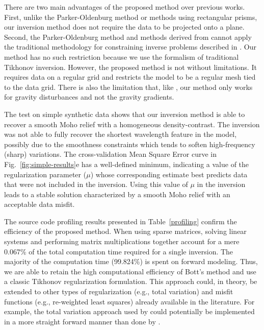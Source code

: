 \documentclass[extra,mreferee]{gji}
\begin{document}
There are two main advantages of the proposed method over previous works.
First, unlike the Parker-Oldenburg method \citep{oldenburg1974} or methods
using rectangular prisms, our inversion method does not require the data to be
projected onto a plane.
Second, the Parker-Oldenburg method and methods derived from \citet{bott1960}
\citep[e.g., ][]{silva2014,santos2015} cannot apply the
traditional methodology for constraining inverse problems
described in \citet{silva2001b}.
Our method has no such restriction because we use the formalism of traditional
Tikhonov inversion.
However, the proposed method is not without limitations.
It requires data on a regular grid and restricts the
model to be a regular mesh tied to the data grid.
There is also the limitation that, like \citet{bott1960},
our method only works for gravity disturbances and not the gravity gradients.

The test on simple synthetic data shows that our inversion method is able to
recover a smooth Moho relief with a homogeneous density-contrast.
The inversion was not able to fully recover the shortest wavelength feature in
the model, possibly due to the smoothness constraints which tends to soften
high-frequency (sharp) variations.
The cross-validation Mean Square Error curve in Fig.~\ref{fig:simple-results}e
has a well-defined minimum, indicating a value of the regularization parameter
($\mu$) whose corresponding estimate best predicts data that were not included
in the inversion.
Using this value of $\mu$ in the inversion leads to a stable solution
characterized by a smooth Moho relief with an acceptable data misfit.

The source code profiling results presented in Table~\ref{profiling}
confirm the efficiency of the proposed method.
When using sparse matrices, solving linear systems and performing matrix
multiplications together account for a mere 0.067\% of the total computation
time required for a single inversion.
The majority of the computation time (99.824\%) is spent on forward modeling.
Thus, we are able to retain the high computational efficiency of Bott's method
and use a classic Tikhonov regularization formulation.
This approach could, in theory, be extended to other types of regularization
(e.g., total variation) and misfit functions (e.g., re-weighted least squares)
already available in the literature.
For example, the total variation approach used by \citet{martins2011} could
potentially be implemented in a more straight forward manner than done by
\citet{santos2015}.
\end{document}
